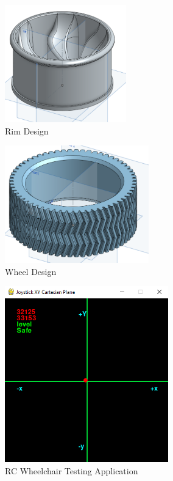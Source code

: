 \documentclass[conference]{IEEEtran}
\begin{document}
\begin{figure}[h]
    \centering
    \includegraphics[keepaspectratio, height=2in]{figs/H/rcmod3.png}
    \caption{Rim Design}
    \label{fig:rcmod3}
\end{figure}\begin{figure}[h]
    \centering
    \includegraphics[keepaspectratio, height=2in]{figs/H/rcmod4.png}
    \caption{Wheel Design}
    \label{fig:rcmod4}
\end{figure}\begin{figure}[h]
    \centering
    \includegraphics[keepaspectratio, height=3in]{figs/H/rctestapp.png}
    \caption{RC Wheelchair Testing Application}
    \label{fig:test_app}
\end{figure}
\onecolumn
\end{document}
